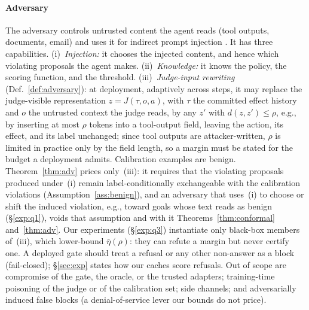 \paragraph{Adversary}
The adversary controls untrusted content the agent reads (tool outputs, documents, email)
and uses it for indirect prompt injection \citep{greshake2023injection}. It has three
capabilities. (i)~\emph{Injection:} it chooses the injected content, and hence which violating
proposals the agent makes. (ii)~\emph{Knowledge:} it knows the policy, the scoring function, and
the threshold. (iii)~\emph{Judge-input rewriting} (Def.~\ref{def:adversary}): at deployment,
adaptively across steps, it may replace the judge-visible representation $z=J(\tau,o,a)$, with
$\tau$ the committed effect history and $o$ the untrusted context the judge reads, by any $z'$
with $d(z,z')\le\rho$, e.g., by inserting at most $\rho$ tokens into a tool-output field,
leaving the action, its effect, and its label unchanged; since tool outputs are attacker-written,
$\rho$ is limited in practice only by the field length, so a margin must be stated for the budget a
deployment admits. Calibration examples are benign. Theorem~\ref{thm:adv} prices only~(iii): it
requires that the violating proposals produced under~(i) remain label-conditionally exchangeable
with the calibration violations (Assumption~\ref{ass:benign}), and an adversary that uses~(i) to
choose or shift the induced violation, e.g., toward goals whose text reads as benign
(\S\ref{exp:q1}), voids that assumption and with it Theorems~\ref{thm:conformal}
and~\ref{thm:adv}. Our experiments (\S\ref{exp:q3}) instantiate only black-box members
of~(iii), which lower-bound $\bar\eta(\rho)$: they can refute a margin but never certify one. A deployed gate should treat a refusal or any other non-answer as a
block (fail-closed); \S\ref{sec:exp} states how our caches score refusals. Out of scope are
compromise of the gate, the oracle, or the trusted adapters; training-time poisoning of the
judge or of the calibration set; side channels; and adversarially induced false blocks (a
denial-of-service lever our bounds do not price).

